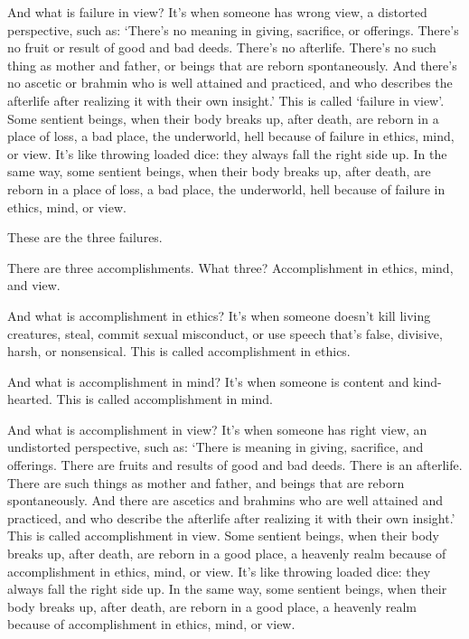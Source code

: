 \documentclass[12pt,openany]{book}%
\begin{document}
And what is failure in view? It’s when someone has wrong view, a distorted perspective, such as: ‘There’s no meaning in giving, sacrifice, or offerings. There’s no fruit or result of good and bad deeds. There’s no afterlife. There’s no such thing as mother and father, or beings that are reborn spontaneously. And there’s no ascetic or brahmin who is well attained and practiced, and who describes the afterlife after realizing it with their own insight.’ This is called ‘failure in view’. Some sentient beings, when their body breaks up, after death, are reborn in a place of loss, a bad place, the underworld, hell because of failure in ethics, mind, or view. It’s like throwing loaded dice: they always fall the right side up. In the same way, some sentient beings, when their body breaks up, after death, are reborn in a place of loss, a bad place, the underworld, hell because of failure in ethics, mind, or view. 

These are the three failures. 

There are three accomplishments. What three? Accomplishment in ethics, mind, and view. 

And what is accomplishment in ethics? It’s when someone doesn’t kill living creatures, steal, commit sexual misconduct, or use speech that’s false, divisive, harsh, or nonsensical. This is called accomplishment in ethics. 

And what is accomplishment in mind? It’s when someone is content and kind-hearted. This is called accomplishment in mind. 

And what is accomplishment in view? It’s when someone has right view, an undistorted perspective, such as: ‘There is meaning in giving, sacrifice, and offerings. There are fruits and results of good and bad deeds. There is an afterlife. There are such things as mother and father, and beings that are reborn spontaneously. And there are ascetics and brahmins who are well attained and practiced, and who describe the afterlife after realizing it with their own insight.’ This is called accomplishment in view. Some sentient beings, when their body breaks up, after death, are reborn in a good place, a heavenly realm because of accomplishment in ethics, mind, or view. It’s like throwing loaded dice: they always fall the right side up. In the same way, some sentient beings, when their body breaks up, after death, are reborn in a good place, a heavenly realm because of accomplishment in ethics, mind, or view. 
\end{document}
